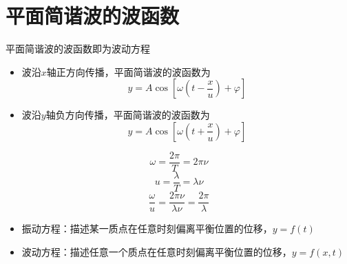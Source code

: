 \documentclass[12pt, a4paper, twoside]{ctexbook}
\begin{document}
\section{平面简谐波的波函数}
平面简谐波的波函数即为波动方程
\begin{itemize}
    \item 波沿$x$轴正方向传播，平面简谐波的波函数为
    $$
    y=A\cos\left[\omega\left(t-\frac{x}{u}\right)+\varphi\right]
    $$
    \item 波沿$y$轴负方向传播，平面简谐波的波函数为
    $$
    y=A\cos\left[\omega\left(t+\frac{x}{u}\right)+\varphi\right]
    $$
\end{itemize}
$$
\omega=\frac{2\pi}{T}=2\pi\nu
$$
$$
u=\frac{\lambda}{T}=\lambda\nu
$$
$$
\frac{\omega}{u}=\frac{2\pi\nu}{\lambda\nu}=\frac{2\pi}{\lambda}
$$
\begin{itemize}
    \item {\sonti 振动方程}：描述某一质点在任意时刻偏离平衡位置的位移，$y=f\left(t\right)$
    \item {\sonti 波动方程}：描述任意一个质点在任意时刻偏离平衡位置的位移，$y=f\left(x,t\right)$
\end{itemize}
\end{document}
